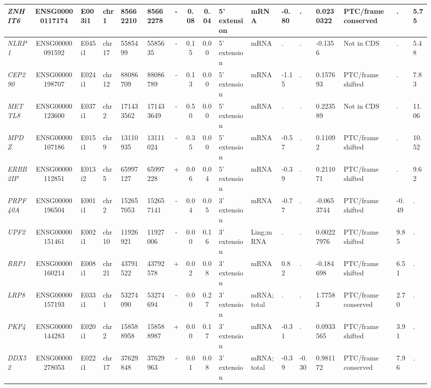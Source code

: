 \begin{landscape}
\begin{table}
{\begin{tabular}{|l|c|l|l|l|l|c|c|c|l|l|l|l|l|l|l|l|}
		\textit{ZNHIT6} & ENSG00000117174 & E003i1 & chr1  & 85662210 & 85662278 & -     & 0.08  & 0.04  & 5' extension & mRNA  & -0.80 & . & 0.0230322 & PTC/frame conserved & . &  5.75 \\ \hline
		\textit{NLRP1} & ENSG00000091592 & E045i1 & chr17 & 5585499 & 5585635 & -     & 0.15  & 0.00  & 5' extension & mRNA  & . & . & -0.1356 & Not in CDS     & . &  5.48 \\ \hline
		\textit{CEP290} & ENSG00000198707 & E024i1 & chr12 & 88086709 & 88086789 & -     & 0.13  & 0.00  & 5' extension & mRNA  & -1.15 & . & 0.157693 & PTC/frame shifted & . &  7.83 \\ \hline
		\textit{METTL8} & ENSG00000123600 & E037i1 & chr2  & 171433562 & 171433649 & -     & 0.50  & 0.00  & 5' extension & mRNA  & . & . & 0.223589 & Not in CDS     & . &  11.06 \\ \hline
		\textit{MPDZ} & ENSG00000107186 & E015i1 & chr9  & 13110935 & 13111024 & -     & 0.35  & 0.00  & 5' extension & mRNA  & -0.57 & . & 0.11092 & PTC/frame shifted & . &  10.52 \\ \hline
		\textit{ERBB2IP} & ENSG00000112851 & E013i2 & chr5  & 65997127 & 65997228 & +     & 0.06  & 0.04  & 5' extension & mRNA  & -0.39 & . & 0.211071 & PTC/frame shifted & . &  9.62 \\ \hline
		\textit{PRPF40A} & ENSG00000196504 & E001i1 & chr2  & 152657053 & 152657141 & -     & 0.04  & 0.05  & 3' extension & mRNA  & -0.77 & . & -0.0653744 & PTC/frame shifted & -0.49 & . \\ \hline
		\textit{UPF2} & ENSG00000151461 & E002i1 & chr10 & 11926921 & 11927006 & -     & 0.00  & 0.16  & 3' extension & Ling;mRNA & . & . & 0.00227976 & PTC/frame shifted & 9.85  & . \\ \hline
		\textit{RRP1} & ENSG00000160214 & E008i1 & chr21 & 43791522 & 43792578 & +     & 0.02  & 0.08  & 3' extension & mRNA  & 0.82  & . & -0.184698 & PTC/frame shifted & 6.51  & . \\ \hline
		\textit{LRP8} & ENSG00000157193 & E033i1 & chr1  & 53274090 & 53274694 & -     & 0.00  & 0.27  & 3' extension & mRNA;total & . & . & 1.77583 & PTC/frame conserved & 2.70  & . \\ \hline
		\textit{PKP4} & ENSG00000144283 & E020i1 & chr2  & 158588958 & 158588987 & +     & 0.00  & 0.17  & 3' extension & mRNA  & -0.31 & . & 0.0933565 & PTC/frame shifted & 3.91  & . \\ \hline
		\textit{DDX52} & ENSG00000278053 & E022i1 & chr17 & 37629848 & 37629963 & -     & 0.01  & 0.08  & 3' extension & mRNA;total & -0.39 & -0.30 & 0.981172 & PTC/frame conserved & 7.96  & . \\ \hline

\end{tabular}}
\end{table}
\end{landscape}
